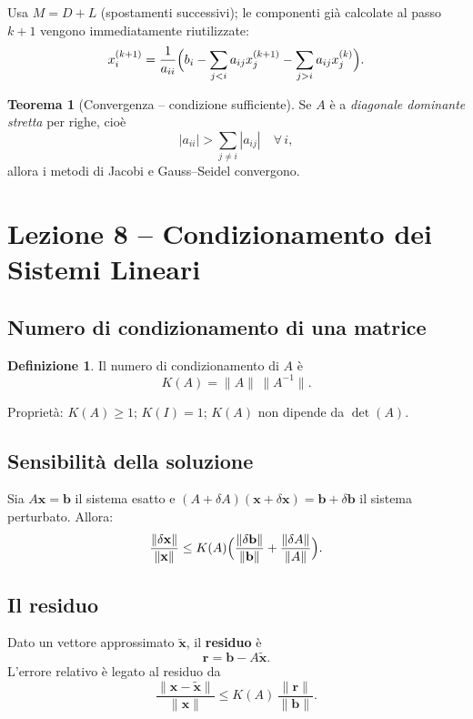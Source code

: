 \documentclass[12pt,a4paper]{article}
\theoremstyle{definition}
\newtheorem{definizione}{Definizione}[section]
\newtheorem{teorema}{Teorema}[section]
\begin{document}
Usa $M = D + L$ (spostamenti successivi); le componenti già calcolate al passo $k+1$ vengono immediatamente riutilizzate:
\[
  x_i^{(k+1)} = \frac{1}{a_{ii}}\Bigl(b_i - \sum_{j < i} a_{ij} x_j^{(k+1)} - \sum_{j > i} a_{ij} x_j^{(k)}\Bigr).
\]

\begin{teorema}[Convergenza -- condizione sufficiente]
Se $A$ è a \emph{diagonale dominante stretta} per righe, cioè
\[
  |a_{ii}| > \sum_{j \neq i} |a_{ij}| \quad \forall\, i,
\]
allora i metodi di Jacobi e Gauss--Seidel convergono.
\end{teorema}

\section{Lezione 8 -- Condizionamento dei Sistemi Lineari}

\subsection{Numero di condizionamento di una matrice}

\begin{definizione}
Il numero di condizionamento di $A$ è
\[
  K(A) = \|A\|\,\|A^{-1}\|.
\]
\end{definizione}

Proprietà: $K(A) \geq 1$; $K(I) = 1$; $K(A)$ non dipende da $\det(A)$.

\subsection{Sensibilità della soluzione}

Sia $A\mathbf{x} = \mathbf{b}$ il sistema esatto e $(A + \delta A)(\mathbf{x} + \delta\mathbf{x}) = \mathbf{b} + \delta\mathbf{b}$ il sistema perturbato. Allora:
\[
  \frac{\|\delta\mathbf{x}\|}{\|\mathbf{x}\|} \leq K(A)
  \Bigl(\frac{\|\delta\mathbf{b}\|}{\|\mathbf{b}\|} + \frac{\|\delta A\|}{\|A\|}\Bigr).
\]

\subsection{Il residuo}

Dato un vettore approssimato $\tilde{\mathbf{x}}$, il \textbf{residuo} è
\[
  \mathbf{r} = \mathbf{b} - A\tilde{\mathbf{x}}.
\]
L'errore relativo è legato al residuo da
\[
  \frac{\|\mathbf{x} - \tilde{\mathbf{x}}\|}{\|\mathbf{x}\|} \leq K(A)\,\frac{\|\mathbf{r}\|}{\|\mathbf{b}\|}.
\]
\end{document}
